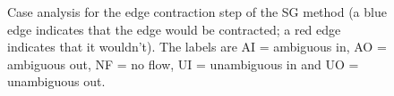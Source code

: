 \documentclass[review,a4paper]{elsarticle}
\newenvironment{stusubfig}[1]
{
	\begin{figure}[#1]
	\begin{center}
}
{
	\end{center}
	\end{figure}
}
\begin{document}
\begin{stusubfig}{p}
	\hspace{4mm}
\caption[Case analysis for the edge contraction step of the SG method]{Case analysis for the edge contraction step of the SG method (a blue edge indicates that the edge would be contracted; a red edge indicates that it wouldn't). The labels are AI = ambiguous in, AO = ambiguous out, NF = no flow, UI = unambiguous in and UO = unambiguous out.}
\label{fig:segmentation-waterfall-smg-mergecases}
\end{stusubfig}
\end{document}

